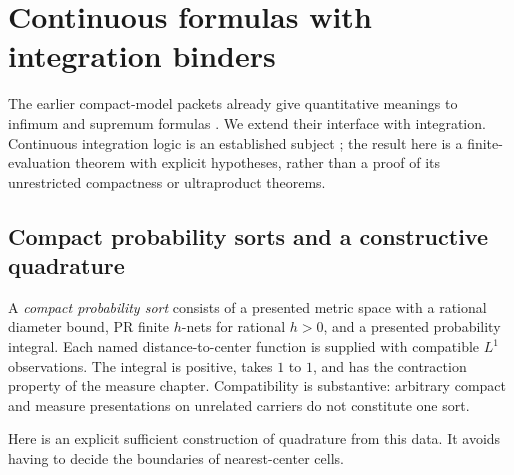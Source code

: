 \section{Continuous formulas with integration binders}\label{sec:logic}

The earlier compact-model packets already give quantitative meanings to
infimum and supremum formulas \cite{repo-abstract,repo-continuous-two}.
We extend their interface with integration. Continuous integration logic
is an established subject \cite{bagheri-pourmahdian}; the result here is a
finite-evaluation theorem with explicit hypotheses, rather than a proof of
its unrestricted compactness or ultraproduct theorems.

\subsection{Compact probability sorts and a constructive quadrature}

A \emph{compact probability sort} consists of a presented metric space
with a rational diameter bound, PR finite $h$-nets for rational $h>0$,
and a presented probability integral. Each named distance-to-center
function is supplied with compatible $L^1$ observations. The integral is
positive, takes $1$ to $1$, and has the contraction property of the measure
chapter. Compatibility is substantive: arbitrary compact and measure
presentations on unrelated carriers do not constitute one sort.

Here is an explicit sufficient construction of quadrature from this data.
It avoids having to decide the boundaries of nearest-center cells.

